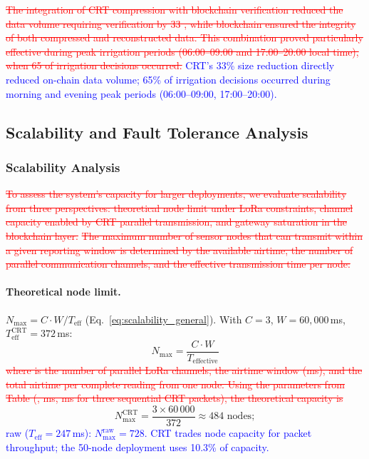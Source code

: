 \documentclass[pdflatex,sn-mathphys-num]{sn-jnl}
\theoremstyle{thmstyleone}
\theoremstyle{thmstyletwo}
\theoremstyle{thmstylethree}
\begin{document}
{\textcolor{red}{\sout{The integration of CRT compression with blockchain verification reduced the data volume requiring verification by 33 , while blockchain ensured the integrity of both compressed and reconstructed data. This combination proved particularly effective during peak irrigation periods (06:00–09:00 and 17:00–20:00 local time), when 65 of irrigation decisions occurred.}}
\textcolor{blue}{CRT's 33\% size reduction directly reduced on-chain data volume; 65\% of irrigation decisions occurred during morning and evening peak periods (06:00–09:00, 17:00–20:00).}

\subsection{Scalability and Fault Tolerance Analysis}
\label{subsec:scalability}
\label{sec:network_capacity}

\subsubsection{Scalability Analysis}
\label{subsubsec:scalability_analysis}

\textcolor{red}{\sout{To assess the system's capacity for larger deployments, we evaluate scalability from three perspectives: theoretical node limit under LoRa constraints, channel capacity enabled by CRT parallel transmission, and gateway saturation in the blockchain layer.}}
\textcolor{red}{\sout{The maximum number of sensor nodes that can transmit within a given reporting window is determined by the available airtime, the number of parallel communication channels, and the effective transmission time per node:}}
\paragraph{Theoretical node limit.} $N_{\max} = C \cdot W / T_{\text{eff}}$ (Eq.~\ref{eq:scalability_general}). With $C=3$, $W=60{,}000$\,ms, $T_{\text{eff}}^{\text{CRT}}=372$\,ms:
\begin{equation}
N_{\max} = \frac{C \cdot W}{T_{\text{effective}}}
\label{eq:scalability_general}
\end{equation}
\textcolor{red}{\sout{where is the number of parallel LoRa channels, the airtime window (ms), and the total airtime per complete reading from one node. Using the parameters from Table (, ms, ms for three sequential CRT packets), the theoretical capacity is}}
\begin{equation}
N_{\max}^{\text{CRT}} = \frac{3 \times 60\,000}{372} \approx 484 \text{ nodes};
\label{eq:node_limit}
\end{equation}
\textcolor{blue}{raw ($T_{\text{eff}}=247$\,ms): $N_{\max}^{\text{raw}}=728$. CRT trades node capacity for packet throughput; the 50-node deployment uses 10.3\% of capacity.}

}
\end{document}
